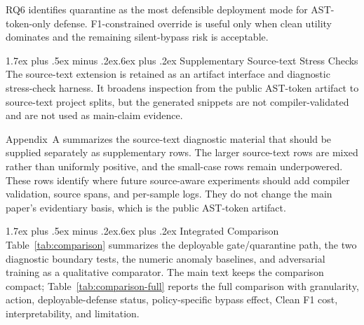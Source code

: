 \documentclass[letterpaper,twocolumn,10pt,twoside]{article}
\makeatletter
\renewcommand\subsection{\@startsection{subsection}{2}{\z@}%
  {1.7ex plus .5ex minus .2ex}{.6ex plus .2ex}%
  {\normalfont\normalsize\bfseries}}
\newcommand{\cleanf}{Clean F1}
\makeatother
\begin{document}
RQ6 identifies quarantine as the most defensible deployment mode for AST-token-only defense. F1-constrained override is useful only when clean utility dominates and the remaining silent-bypass risk is acceptable.

\subsection{Supplementary Source-text Stress Checks}
The source-text extension is retained as an artifact interface and diagnostic stress-check harness. It broadens inspection from the public AST-token artifact to source-text project splits, but the generated snippets are not compiler-validated and are not used as main-claim evidence.

Appendix~A summarizes the source-text diagnostic material that should be supplied separately as supplementary rows. The larger source-text rows are mixed rather than uniformly positive, and the small-case rows remain underpowered. These rows identify where future source-aware experiments should add compiler validation, source spans, and per-sample logs. They do not change the main paper's evidentiary basis, which is the public AST-token artifact.

\subsection{Integrated Comparison}
Table~\ref{tab:comparison} summarizes the deployable gate/quarantine path, the two diagnostic boundary tests, the numeric anomaly baselines, and adversarial training as a qualitative comparator. The main text keeps the comparison compact; Table~\ref{tab:comparison-full} reports the full comparison with granularity, action, deployable-defense status, policy-specific bypass effect, \cleanf{} cost, interpretability, and limitation.
\end{document}
